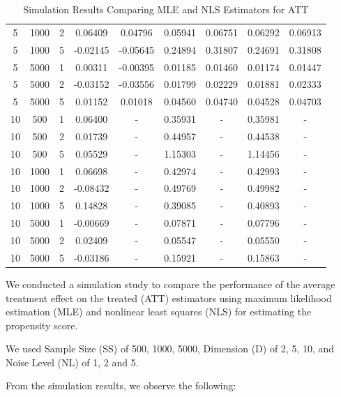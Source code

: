 \documentclass{article}
\begin{document}
\begin{table}[H]
\begin{tabular}{|ccc|cccccc|}
      5 & 1000 & 2 & 0.06409 & 0.04796 & 0.05941 & 0.06751 & 0.06292 & 0.06913 \\
      5 & 1000 & 5 & -0.02145 & -0.05645 & 0.24894 & 0.31807 & 0.24691 & 0.31808 \\
      5 & 5000 & 1 & 0.00311 & -0.00395 & 0.01185 & 0.01460 & 0.01174 & 0.01447 \\
      5 & 5000 & 2 & -0.03152 & -0.03556 & 0.01799 & 0.02229 & 0.01881 & 0.02333 \\
      5 & 5000 & 5 & 0.01152 & 0.01018 & 0.04560 & 0.04740 & 0.04528 & 0.04703 \\
      10 & 500 & 1 & 0.06400 & - & 0.35931 & - & 0.35981 & - \\
      10 & 500 & 2 & 0.01739 & - & 0.44957 & - & 0.44538 & - \\
      10 & 500 & 5 & 0.05529 & - & 1.15303 & - & 1.14456 & - \\
      10 & 1000 & 1 & 0.06698 & - & 0.42974 & - & 0.42993 & - \\
      10 & 1000 & 2 & -0.08432 & - & 0.49769 & - & 0.49982 & - \\
      10 & 1000 & 5 & 0.14828 & - & 0.39085 & - & 0.40893 & - \\
      10 & 5000 & 1 & -0.00669 & - & 0.07871 & - & 0.07796 & - \\
      10 & 5000 & 2 & 0.02409 & - & 0.05547 & - & 0.05550 & - \\
      10 & 5000 & 5 & -0.03186 & - & 0.15921 & - & 0.15863 & - \\
      \hline
  \end{tabular}
  \caption{Simulation Results Comparing MLE and NLS Estimators for ATT}
\end{table}

We conducted a simulation study to compare the performance of the average treatment effect on the treated (ATT) estimators using maximum likelihood estimation (MLE) and nonlinear least squares (NLS) for estimating the propensity score.

We used Sample Size (SS) of 500, 1000, 5000, Dimension (D) of 2, 5, 10, and Noise Level (NL) of 1, 2 and 5.

From the simulation results, we observe the following:
\end{document}

